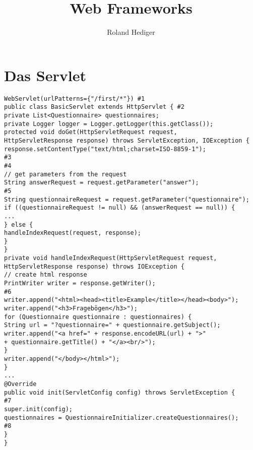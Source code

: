 \documentclass[a4paper,10pt]{scrreprt}
\title{Web Frameworks}
\author{Roland Hediger}
\begin{document}
\maketitle 
\tableofcontents
\pagestyle{fancy}
\chapter{Das Servlet}
\begin{lstlisting}[caption="Servlet Example]
 WebServlet(urlPatterns={"/first/*"}) #1
public class BasicServlet extends HttpServlet { #2
private List<Questionnaire> questionnaires;
private Logger logger = Logger.getLogger(this.getClass());
protected void doGet(HttpServletRequest request,
HttpServletResponse response) throws ServletException, IOException {
response.setContentType("text/html;charset=ISO-8859-1");
#3
#4
// get parameters from the request
String answerRequest = request.getParameter("answer");
#5
String questionnaireRequest = request.getParameter("questionnaire");
if ((questionnaireRequest != null) && (answerRequest == null)) {
...
} else {
handleIndexRequest(request, response);
}
}
private void handleIndexRequest(HttpServletRequest request,
HttpServletResponse response) throws IOException {
// create html response
PrintWriter writer = response.getWriter();
#6
writer.append("<html><head><title>Example</title></head><body>");
writer.append("<h3>Fragebögen</h3>");
for (Questionnaire questionnaire : questionnaires) {
String url = "?questionnaire=" + questionnaire.getSubject();
writer.append("<a href=" + response.encodeURL(url) + ">"
+ questionnaire.getTitle() + "</a><br/>");
}
writer.append("</body></html>");
}
...
@Override
public void init(ServletConfig config) throws ServletException {
#7
super.init(config);
questionnaires = QuestionnaireInitializer.createQuestionnaires();
#8
}
}
\end{lstlisting}
\end{document}
